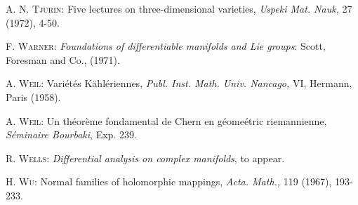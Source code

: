 \begin{thebibliography}{99}
 \textsc{A. N. Tjurin}: Five lectures on three-dimensional varieties, \textit{Uspeki Mat. Nauk,} 27 (1972), 4-50.

 \textsc{F. Warner}: \textit{Foundations of differentiable manifolds and Lie groups}: Scott, Foresman and Co., (1971).

 \textsc{A. Weil}: Vari\'et\'es K\"ahl\'eriennes, \textit{Publ. Inst. Math. Univ. Nancago,} VI, Hermann, Paris (1958).

 \textsc{A. Weil}: Un th\'eor\`eme fondamental de Chern en g\'eome\'etric riemannienne, \textit{S\'eminaire Bourbaki}, Exp. 239.

 \textsc{R. Wells}: \textit{Differential analysis on complex manifolds}, to appear.

 \textsc{H. Wu}: Normal families of holomorphic mappings, \textit{Acta. Math.,} 119 (1967), 193-233.
\end{thebibliography}





